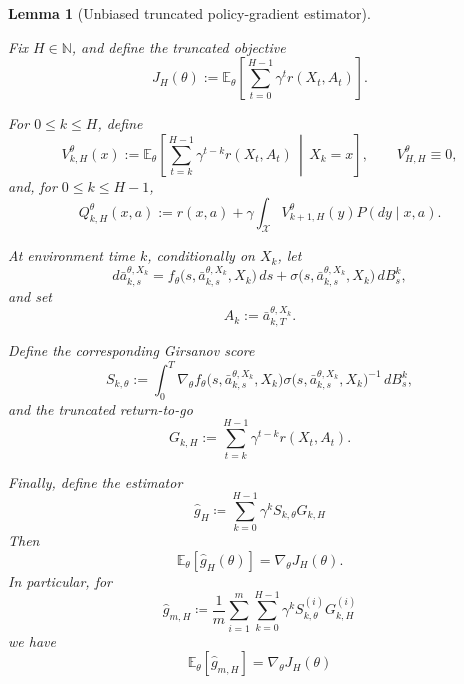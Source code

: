 \documentclass{article}
\newtheorem{lem}[thm]{Lemma}
\theoremstyle{definition}
\theoremstyle{remark}
\theoremstyle{mystyle}
\newcommand{\E}{\mathbb{E}}
\newcommand{\1}{\mathbbm{1}}
\begin{document}
\begin{lem}[Unbiased truncated policy-gradient estimator]
\label{lem:unbiased-truncated-gradient}

Fix \(H\in\mathbb N\), and define the truncated objective
\[
J_H(\theta)
:=
\mathbb E_\theta
\left[
\sum_{t=0}^{H-1}
\gamma^t r(X_t,A_t)
\right].
\]

For \(0\le k\le H\), define
\[
V_{k,H}^{\theta}(x)
:=
\mathbb E_\theta
\left[
\sum_{t=k}^{H-1}
\gamma^{t-k}r(X_t,A_t)
\,\middle|\,
X_k=x
\right],
\qquad
V_{H,H}^{\theta}\equiv 0,
\]
and, for \(0\le k\le H-1\),
\[
Q_{k,H}^{\theta}(x,a)
:=
r(x,a)
+
\gamma
\int_{\mathcal X}
V_{k+1,H}^{\theta}(y)
P(dy\mid x,a).
\]

At environment time \(k\), conditionally on \(X_k\), let
\[
d\bar a_{k,s}^{\theta,X_k}
=
f_\theta
\bigl(s,\bar a_{k,s}^{\theta,X_k},X_k\bigr)\,ds
+
\sigma
\bigl(s,\bar a_{k,s}^{\theta,X_k},X_k\bigr)\,dB_s^k,
\]
and set
\[
A_k
:=
\bar a_{k,T}^{\theta,X_k}.
\]

Define the corresponding Girsanov score
\[
S_{k,\theta}
:=
\int_0^T
\nabla_\theta f_\theta
\bigl(s,\bar a_{k,s}^{\theta,X_k},X_k\bigr)
\sigma
\bigl(s,\bar a_{k,s}^{\theta,X_k},X_k\bigr)^{-1}
\,dB_s^k,
\]
and the truncated return-to-go
\[
G_{k,H}
:=
\sum_{t=k}^{H-1}
\gamma^{t-k}r(X_t,A_t).
\]

Finally, define the estimator
\[
\hat{g}_H\coloneqq\sum^{H-1}_{k=0}\gamma^k S_{k,\theta}G_{k,H}
\]
Then
\[
\mathbb E_\theta[\widehat g_H(\theta)]
=
\nabla_\theta J_H(\theta).
\]
In particular, for 
\[
\hat{g}_{m,H}\coloneqq \frac{1}{m}\sum^{m}_{i=1}\sum^{H-1}_{k=0}\gamma^k S^{(i)}_{k,\theta}G^{(i)}_{k,H}
\]
we have 
\[
\E_\theta[\hat{g}_{m,H}]=\nabla_\theta J_H(\theta)
\]
\end{lem}
\end{document}
